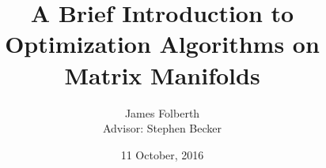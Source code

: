 \documentclass[xcolor=dvipsnames,t]{beamer} %
\title{A Brief Introduction to Optimization Algorithms on Matrix Manifolds}
\date{11 October, 2016}
\author{James Folberth\\Advisor: Stephen Becker}
\institute{University of Colorado at Boulder}
\begin{document}
\begin{frame}
\maketitle
\end{frame}




%
%      
%
%
%
%
%
\end{document}
